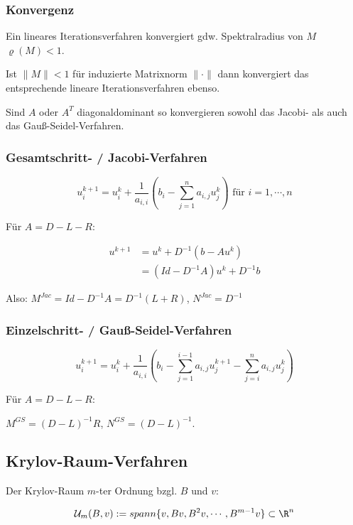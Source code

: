 \subsubsection*{Konvergenz}

Ein lineares Iterationsverfahren konvergiert gdw. Spektralradius von $M$ $\varrho(M) < 1$.

Ist $\|M\| < 1$ für induzierte Matrixnorm $\|\cdot\|$ dann konvergiert das entsprechende lineare Iterationsverfahren ebenso.

Sind $A$ oder $A^T$ diagonaldominant so konvergieren sowohl das Jacobi- als auch das Gauß-Seidel-Verfahren.

\subsubsection*{Gesamtschritt- / Jacobi-Verfahren}

$$u_i^{k+1} = u_i^k + \frac{1}{a_{i,i}}\left(b_i - \sum_{j=1}^n a_{i,j} u_j^k \right) \text{ für } i = 1, \cdots, n$$

Für $A = D - L - R$:

\vspace{-4mm}
\begin{align*}
	u^{k+1} &= u^k + D^{-1}(b-Au^k) \\
	        &= (Id - D^{-1}A)u^k + D^{-1}b
\end{align*}

Also: $M^{Jac} = Id - D^{-1}A = D^{-1}(L+R)$, $N^{Jac} = D^{-1}$

\subsubsection*{Einzelschritt- / Gauß-Seidel-Verfahren}

$$u_i^{k+1} = u_i^k + \frac{1}{a_{i,i}}\left(b_i - \sum_{j=1}^{i-1} a_{i,j} u_j^{k+1} - \sum_{j=i}^n a_{i,j} u_j^k \right)$$

Für $A = D - L - R$:

$M^{GS} = (D - L)^{-1}R$, $N^{GS} = (D - L)^{-1}$.

\subsection*{Krylov-Raum-Verfahren}

Der Krylov-Raum $m$-ter Ordnung bzgl. $B$ und $v$:

\vspace{-4mm}
$$\mathcal{U}_m(B,v) := spann\{v,Bv,B^2v, \cdots, B^{m-1}v\} \subset \R^n$$

